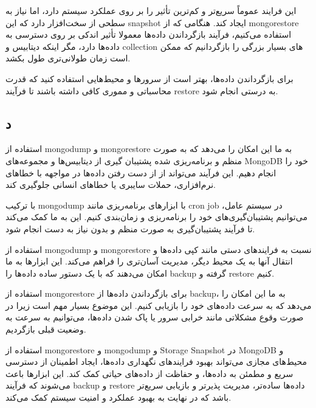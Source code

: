 این فرایند عموماً سریع‌تر و کم‌ترین تأثیر را بر روی عملکرد سیستم دارد، اما نیاز به سطحی از سخت‌افزار دارد که این snapshot ایجاد کند.
هنگامی که از mongorestore استفاده می‌کنیم، فرآیند بازگرداندن داده‌ها معمولا تأثیر اندکی بر روی دسترسی به داده‌ها دارد، مگر اینکه دیتابیس و collection های بسیار بزرگی را بازگردانیم که ممکن است زمان طولانی‌تری طول بکشد.


برای بازگرداندن داده‌ها، بهتر است از سرورها و محیط‌هایی استفاده کنید که قدرت محاسباتی و مموری کافی داشته باشند تا فرآیند restore به درستی انجام شود.


\subsection*{د}
استفاده از mongodump و mongorestore به ما این امکان را می‌دهد که به صورت منظم و برنامه‌ریزی شده پشتیبان گیری از دیتابیس‌ها و مجموعه‌های MongoDB خود را انجام دهیم. این فرآیند می‌تواند از از دست رفتن داده‌ها در مواجهه با خطاهای نرم‌افزاری، حملات سایبری یا خطاهای انسانی جلوگیری کند.

با ترکیب mongodump با ابزارهای برنامه‌ریزی مانند cron job در سیستم عامل، می‌توانیم پشتیبان‌گیری‌های خود را برنامه‌ریزی و زمان‌بندی کنیم. این به ما کمک می‌کند تا فرآیند پشتیبان‌گیری به صورت منظم و بدون نیاز به دست انجام شود.

استفاده از mongodump و mongorestore نسبت به فرایندهای دستی مانند کپی داده‌ها و انتقال آنها به یک محیط دیگر، مدیریت آسان‌تری را فراهم می‌کند. این ابزارها به ما امکان می‌دهند که با یک دستور ساده داده‌ها را backup گرفته و restore کنیم.

استفاده از mongorestore برای بازگرداندن داده‌ها از backup، به ما این امکان را می‌دهد که به سرعت داده‌های خود را بازیابی کنیم. این موضوع بسیار مهم است زیرا در صورت وقوع مشکلاتی مانند خرابی سرور یا پاک شدن داده‌ها، می‌توانیم به سرعت به وضعیت قبلی بازگردیم.

استفاده از mongorestore و  mongodump و Storage Snapshot در MongoDB و محیط‌های مجازی می‌تواند بهبود فرایندهای نگهداری داده‌ها، ایجاد اطمینان از دسترسی سریع و مطمئن به داده‌ها، و حفاظت از داده‌های حیاتی کمک کند. این ابزارها باعث می‌شوند که فرآیند backup و restore داده‌ها ساده‌تر، مدیریت پذیرتر و بازیابی سریع‌تر باشد که در نهایت به بهبود عملکرد و امنیت سیستم کمک می‌کند.